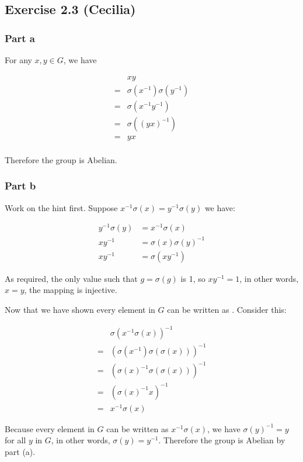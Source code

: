 \subsection*{Exercise 2.3 (Cecilia)}

\subsubsection*{Part a}
For any $ x, y \in G $, we have

\begin{align*}
   & xy \\
  =& \sigma(x^{-1}) \sigma(y^{-1}) \\
  =& \sigma(x^{-1}y^{-1})          \\
  =& \sigma((yx)^{-1})             \\
  =& yx \\
\end{align*}

Therefore the group is Abelian.

\subsubsection*{Part b}

Work on the hint first. Suppose $ x^{-1}\sigma(x) = y^{-1}\sigma(y) $ we have:

\begin{align*}
   y^{-1}\sigma(y) &= x^{-1}\sigma(x)         \\
           xy^{-1} &= \sigma(x)\sigma(y)^{-1} \\
           xy^{-1} &= \sigma(xy^{-1})
\end{align*}

As required, the only value such that $ g = \sigma(g) $ is 1, so $ xy^{-1} = 1 $, in other words, $ x = y $, the mapping is injective.

Now that we have shown every element in $ G $ can be written as . Consider this:

\begin{align*}
   & \sigma(x^{-1}\sigma(x))^{-1}           \\
  =& (\sigma(x^{-1})\sigma(\sigma(x)))^{-1} \\
  =& (\sigma(x)^{-1}\sigma(\sigma(x)))^{-1} \\
  =& (\sigma(x)^{-1}x)^{-1}                 \\
  =& x^{-1}\sigma(x)
\end{align*}

Because every element in $ G $ can be written as $ x^{-1}\sigma(x) $, we have $ \sigma(y)^{-1} = y $ for all $ y $ in $ G $, in other words, $ \sigma(y) = y^{-1} $. Therefore the group is Abelian by part (a).